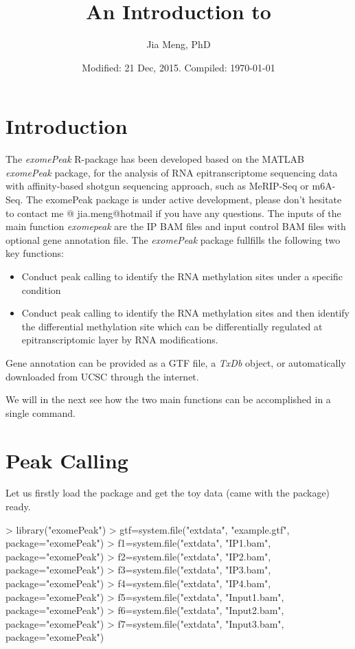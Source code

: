 \documentclass[]{article}
\title{An Introduction to \Rpackage{exomePeak}}
\author{Jia Meng, PhD}
\date{Modified: 21 Dec, 2015. Compiled: \today}
\newcommand{\Rpackage}[1]{{\textit{#1}}}
\newcommand{\Rclass}[1]{{\textit{#1}}}
\newcommand{\exomePeak}{\Rpackage{exomePeak}}
\begin{document}

\maketitle



\section{Introduction}
The \exomePeak{} R-package has been developed based on the MATLAB \Rpackage{exomePeak} package, 
for the analysis of RNA epitranscriptome sequencing data with affinity-based shotgun sequencing approach, such as MeRIP-Seq or m6A-Seq. The exomePeak package is under active development, please don't hesitate to contact me @ jia.meng@hotmail if you have any questions. The inputs of the main function \Rpackage{exomepeak} are the IP BAM files and input control BAM files with optional gene annotation file. The \Rpackage{exomePeak} package fullfills the following two key functions:
\begin{itemize}
  \item Conduct peak calling to identify the RNA methylation sites under a specific condition
  \item Conduct peak calling to identify the RNA methylation sites and then identify the differential methylation site which can be differentially regulated at epitranscriptomic layer by RNA modifications.
\end{itemize}
Gene annotation can be provided as a GTF file, a \Rclass{TxDb} object, or automatically downloaded from UCSC through the internet. 

We will in the next see how the two main functions can be accomplished in a single command. 


\section{Peak Calling}
Let us firstly load the package and get the toy data (came with the package) ready.

\begin{Schunk}
\begin{Sinput}
> library("exomePeak")
> gtf=system.file("extdata", "example.gtf", package="exomePeak")
> f1=system.file("extdata", "IP1.bam", package="exomePeak")
> f2=system.file("extdata", "IP2.bam", package="exomePeak")
> f3=system.file("extdata", "IP3.bam", package="exomePeak")
> f4=system.file("extdata", "IP4.bam", package="exomePeak")
> f5=system.file("extdata", "Input1.bam", package="exomePeak")
> f6=system.file("extdata", "Input2.bam", package="exomePeak")
> f7=system.file("extdata", "Input3.bam", package="exomePeak")
\end{Sinput}
\end{Schunk}
\end{document}
